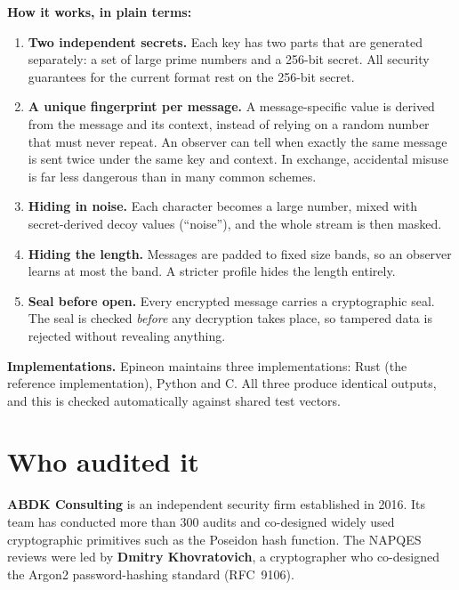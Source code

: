 ﻿\documentclass[11pt,a4paper]{article}
\begin{document}
\textbf{How it works, in plain terms:}
\begin{enumerate}
  \item \textbf{Two independent secrets.} Each key has two parts that are generated separately:
        a set of large prime numbers and a 256-bit secret. All security guarantees for the
        current format rest on the 256-bit secret.
  \item \textbf{A unique fingerprint per message.} A message-specific value is derived from the
        message and its context, instead of relying on a random number that must never repeat.
        An observer can tell when exactly the same message is sent twice under the same key and
        context. In exchange, accidental misuse is far less dangerous than in many common
        schemes.
  \item \textbf{Hiding in noise.} Each character becomes a large number, mixed with
        secret-derived decoy values (``noise''), and the whole stream is then masked.
  \item \textbf{Hiding the length.} Messages are padded to fixed size bands, so an observer
        learns at most the band. A stricter profile hides the length entirely.
  \item \textbf{Seal before open.} Every encrypted message carries a cryptographic seal. The seal
        is checked \emph{before} any decryption takes place, so tampered data is rejected
        without revealing anything.
\end{enumerate}

\textbf{Implementations.} Epineon maintains three implementations: Rust (the reference
implementation), Python and C. All three produce identical outputs, and this is checked
automatically against shared test vectors.

\section{Who audited it}
\textbf{ABDK Consulting} is an independent security firm established in 2016. Its team has
conducted more than 300 audits and co-designed widely used cryptographic primitives such as the
Poseidon hash function. The NAPQES reviews were led by \textbf{Dmitry Khovratovich}, a
cryptographer who co-designed the Argon2 password-hashing standard (RFC~9106).
\end{document}
